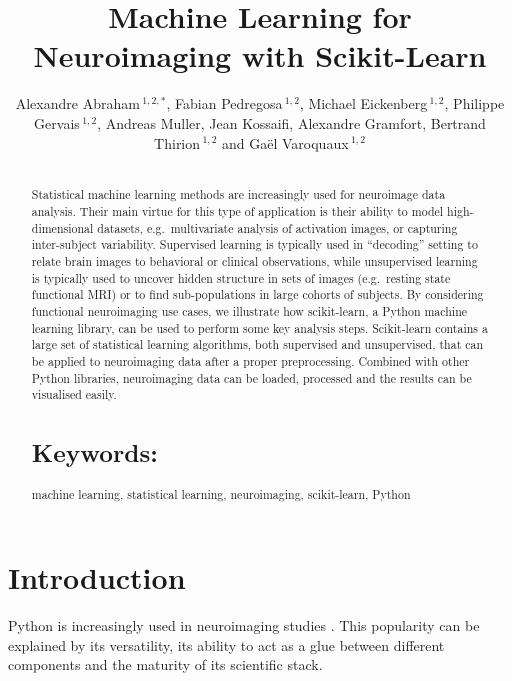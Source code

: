 \documentclass{frontiersSCNS} %
\def\firstAuthorLast{Alexandre Abraham {et~al}} %
\def\Authors{
    Alexandre Abraham\,$^{1,2,*}$,
    Fabian Pedregosa\,$^{1,2}$,
    Michael Eickenberg\,$^{1,2}$,
    Philippe Gervais\,$^{1,2}$,
    Andreas Muller,
    Jean Kossaifi,
    Alexandre Gramfort,
    Bertrand Thirion\,$^{1,2}$
    and Ga\"el Varoquaux\,$^{1,2}$}
\newcounter{x}
\newcounter{y}
\begin{document}
\onecolumn
{}

\title[Machine Learning for Neuroimaging with Scikit-Learn]{Machine Learning for Neuroimaging with Scikit-Learn}
\author[\firstAuthorLast ]{\Authors}
\address{}
\correspondance{}
\editor{}

\maketitle
\begin{abstract}

\section{}
Statistical machine learning methods are increasingly used for
neuroimage data analysis. Their main virtue for this type of application
is their ability to model high-dimensional datasets, e.g.\ multivariate
analysis of activation images, or capturing inter-subject variability.
Supervised learning is typically used in “decoding” setting to relate
brain images to behavioral or clinical observations, while
unsupervised learning is typically used to uncover hidden structure in
sets of images (e.g.\ resting state functional MRI) or to find
sub-populations in large cohorts of subjects. By considering
functional neuroimaging use cases, we illustrate how scikit-learn,
a Python machine learning library, can be used to perform some key
analysis steps. Scikit-learn contains a large set of statistical
learning algorithms, both supervised and unsupervised, that can be applied
to neuroimaging data after a proper preprocessing. Combined with other
Python libraries, neuroimaging data can be loaded, processed and the results
can be visualised easily.



\tiny
\section{Keywords:} machine learning, statistical learning, neuroimaging,
scikit-learn, Python
\end{abstract}


\section{Introduction}

Python is increasingly used in neuroimaging studies \citep{millman2007analysis,
hanke2009pymvpa}. This popularity can be explained by its
versatility, its ability to act as a glue between different components and the
maturity of its scientific stack.
\end{document}
